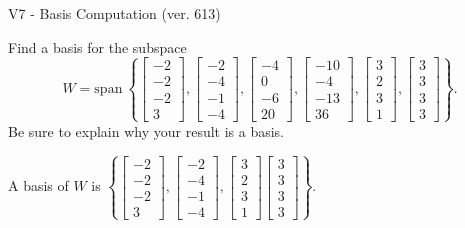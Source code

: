 \begin{exercise}
  \begin{exerciseTitle}V7 - Basis Computation (ver. 613)\end{exerciseTitle}
  \begin{exerciseStatement}
    Find a basis for the subspace 
\[W=\mathrm{span}\ \left\{\left[\begin{array}{r}
-2 \\
-2 \\
-2 \\
3
\end{array}\right] , \left[\begin{array}{r}
-2 \\
-4 \\
-1 \\
-4
\end{array}\right] , \left[\begin{array}{r}
-4 \\
0 \\
-6 \\
20
\end{array}\right] , \left[\begin{array}{r}
-10 \\
-4 \\
-13 \\
36
\end{array}\right] , \left[\begin{array}{r}
3 \\
2 \\
3 \\
1
\end{array}\right] , \left[\begin{array}{r}
3 \\
3 \\
3 \\
3
\end{array}\right]\right\}.\]
 Be sure to explain why your result is a basis.


  \end{exerciseStatement}
  \begin{exerciseAnswer}
   A basis of \(W\) is  \(\left\{\left[\begin{array}{r}
-2 \\
-2 \\
-2 \\
3
\end{array}\right] , \left[\begin{array}{r}
-2 \\
-4 \\
-1 \\
-4
\end{array}\right] , \left[\begin{array}{r}
3 \\
2 \\
3 \\
1
\end{array}\right] \left[\begin{array}{r}
3 \\
3 \\
3 \\
3
\end{array}\right]\right\}\).
  


  \end{exerciseAnswer}
\end{exercise}
